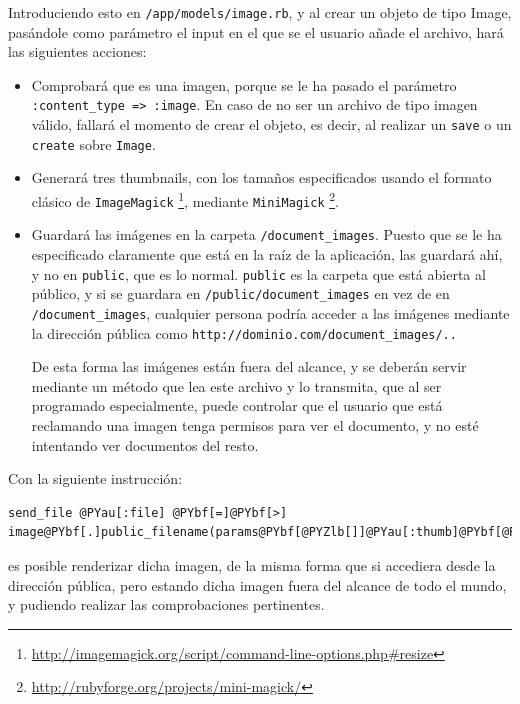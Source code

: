 Introduciendo esto en \texttt{/app/models/image.rb}, y al crear un objeto de tipo Image, pasándole como parámetro el input en el que se el usuario añade el archivo, hará las siguientes acciones:

\begin{itemize}
  \item Comprobará que es una imagen, porque se le ha pasado el parámetro \texttt{:content\_type => :image}. En caso de no ser un archivo de tipo imagen válido, fallará el momento de crear el objeto, es decir, al realizar un \texttt{save} o un \texttt{create} sobre \texttt{Image}.
  \item Generará tres thumbnails, con los tamaños especificados usando el formato clásico de \texttt{ImageMagick} \footnote{\url{http://imagemagick.org/script/command-line-options.php\#resize}}, mediante \texttt{MiniMagick} \footnote{\url{http://rubyforge.org/projects/mini-magick/}}.
  \item Guardará las imágenes en la carpeta \texttt{/document\_images}. Puesto que se le ha especificado claramente que está en la raíz de la aplicación, las guardará ahí, y no en \texttt{public}, que es lo normal. \texttt{public} es la carpeta que está abierta al público, y si se guardara en \texttt{/public/document\_images} en vez de en \texttt{/document\_images}, cualquier persona podría acceder a las imágenes mediante la dirección pública como \texttt{http://dominio.com/document\_images/..}
  
  De esta forma las imágenes están fuera del alcance, y se deberán servir mediante un método que lea este archivo y lo transmita, que al ser programado especialmente, puede controlar que el usuario que está reclamando una imagen tenga permisos para ver el documento, y no esté intentando ver documentos del resto.
\end{itemize}

Con la siguiente instrucción:


\begin{Verbatim}[commandchars=@\[\]]
  send_file @PYau[:file] @PYbf[=]@PYbf[>] image@PYbf[.]public_filename(params@PYbf[@PYZlb[]]@PYau[:thumb]@PYbf[@PYZrb[]])
\end{Verbatim}


es posible renderizar dicha imagen, de la misma forma que si accediera desde la dirección pública, pero estando dicha imagen fuera del alcance de todo el mundo, y pudiendo realizar las comprobaciones pertinentes.

